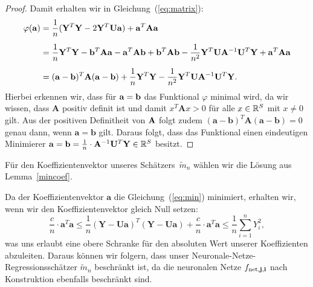 \begin{proof}
Damit erhalten wir in Gleichung~(\ref{eq:matrix}):
\begin{equation*}
\begin{split}
\varphi(\mathbf{a}) & = \frac{1}{n}(\mathbf{Y}^T\mathbf{Y} - 2\mathbf{Y}^T\mathbf{U}\mathbf{a}) + \mathbf{a}^T \mathbf{A} \mathbf{a} \\[0.5em]
& = \frac{1}{n}\mathbf{Y}^T\mathbf{Y} - \mathbf{b}^T\mathbf{A}\mathbf{a} - \mathbf{a}^T\mathbf{A}\mathbf{b} + \mathbf{b}^T\mathbf{A}\mathbf{b} - \frac{1}{n^2}\mathbf{Y}^T\mathbf{U}\mathbf{A}^{-1}\mathbf{U}^T\mathbf{Y} + \mathbf{a}^T\mathbf{A}\mathbf{a} \\[0.5em]
& = (\mathbf{a} - \mathbf{b})^T \mathbf{A} (\mathbf{a} - \mathbf{b}) + \frac{1}{n}\mathbf{Y}^T\mathbf{Y} - \frac{1}{n^2}\mathbf{Y}^T\mathbf{U}\mathbf{A}^{-1}\mathbf{U}^T\mathbf{Y}.
\end{split} 
\end{equation*} 
Hierbei erkennen wir, dass für $\mathbf{a} = \mathbf{b}$ das Funktional $\varphi$ minimal wird, 
da wir wissen, dass $\mathbf{A}$ positiv definit ist und damit $x^T\mathbf{A}x > 0$ für alle $x \in \mathbb{R}^S$ mit $x \neq 0$ gilt. Aus der positiven Definitheit von $\mathbf{A}$ folgt zudem $(\mathbf{a} - \mathbf{b})^T\mathbf{A}(\mathbf{a} - \mathbf{b}) = 0$ genau dann, wenn $\mathbf{a} = \mathbf{b}$ gilt. Daraus folgt, dass das Funktional einen eindeutigen Minimierer $\mathbf{a} = \mathbf{b} = \frac{1}{n} \cdot \mathbf{A}^{-1}\mathbf{U}^T\mathbf{Y} \in \mathbb{R}^S$ besitzt.
\end{proof}
Für den Koeffizientenvektor unseres Schätzers~$\tilde{m}_n$ wählen wir die Lösung aus Lemma~\ref{mincoef}.
\begin{bemnumber}
\label{mtildebeschraenkt}
Da der Koeffizientenvektor $\mathbf{a}$ die Gleichung~(\ref{eq:min}) minimiert, erhalten wir, wenn wir den Koeffizientenvektor gleich Null setzen:
$$\frac{c}{n} \cdot \mathbf{a}^T\mathbf{a} \leq \frac{1}{n}(\mathbf{Y} - \mathbf{U}\mathbf{a})^T(\mathbf{Y} - \mathbf{U}\mathbf{a}) + \frac{c}{n} \cdot \mathbf{a}^T\mathbf{a} \leq \frac{1}{n} \sum_{i = 1}^n Y_i^2,$$
was uns erlaubt eine obere Schranke für den absoluten Wert unserer Koeffizienten abzuleiten. Daraus können wir folgern, dass unser Neuronale-Netze-Regressionsschätzer $\tilde{m}_n$ beschränkt ist, da die neuronalen Netze $f_{\mathrm{net},\mathbf{j},\mathbf{i}}$ nach Konstruktion ebenfalls beschränkt sind.
\end{bemnumber}